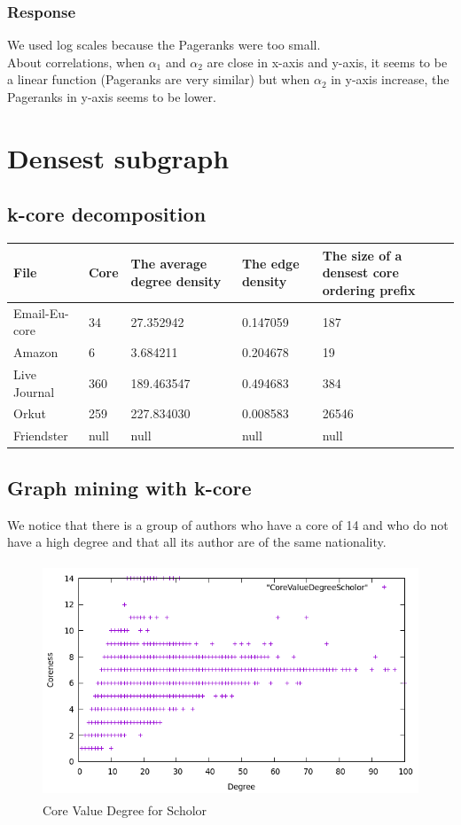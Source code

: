 \documentclass{article}
\begin{document}
\clearpage

 \subsubsection{Response}
We used log scales because the Pageranks were too small.\\
About correlations, when $\alpha_1$ and $\alpha_2$ are close in x-axis and y-axis, it seems to be a linear function (Pageranks are very similar) but when $\alpha_2$ in y-axis increase, the Pageranks in y-axis seems to be lower.

\section{Densest subgraph}
\subsection{k-core decomposition}

\begin{tabular}{ |p{2.5cm}||p{1.5cm}|p{2.8cm}|p{2.8cm}|p{2.8cm}| }
 \hline
 File & Core & The average degree density & The edge density & The size of a densest core ordering prefix\\
 \hline
 Email-Eu-core & 34 & 27.352942 & 0.147059 & 187\\
 Amazon & 6 & 3.684211 & 0.204678 & 19 \\
 Live Journal & 360 & 189.463547 & 0.494683 & 384\\
 Orkut & 259 & 227.834030 & 0.008583 & 26546\\
 Friendster & null & null & null & null\\
 \hline
\end{tabular}


\subsection{Graph mining with k-core}
We notice that there is a group of authors who have a core of 14 and who do not have a high degree and that all its author are of the same nationality.

\begin{figure}[h!]
  \includegraphics[width=12cm, height=7cm]{google_scholor.png}
  \caption{Core Value Degree for Scholor}
\end{figure}
\end{document}
